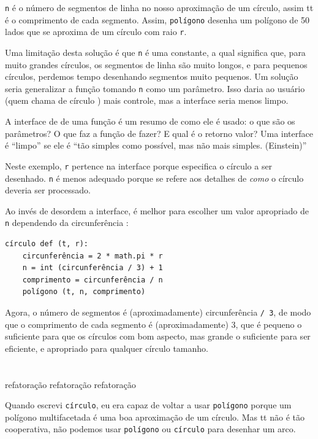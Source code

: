 \documentclass[10pt]{book}
\begin{document}
\begin{exercise}
{\tt n} é o número de segmentos de linha no nosso aproximação de um círculo,
assim {\comprimento tt} é o comprimento de cada segmento. Assim, {\tt polígono}
desenha um polígono de 50 lados que se aproxima de um círculo com raio {\tt r}.

Uma limitação desta solução é que {\tt n} é uma constante, a qual
significa que, para muito grandes círculos, os segmentos de linha são muito longos, e
para pequenos círculos, perdemos tempo desenhando segmentos muito pequenos. Um
solução seria generalizar a função tomando {\tt n} como
um parâmetro. Isso daria ao usuário (quem chama de círculo {\tt})
mais controle, mas a interface seria menos limpo.

A interface de {\bf} de uma função é um resumo de como ele é usado: o que
são os parâmetros? O que faz a função de fazer? E qual é o retorno
valor? Uma interface é ``limpo'' se ele é ``tão simples como
possível, mas não mais simples. (Einstein)''

Neste exemplo, {\tt r} pertence na interface porque
especifica o círculo a ser desenhado. {\tt n} é menos adequado
porque se refere aos detalhes de {\em como} o círculo deveria
ser processado.

Ao invés de desordem a interface, é melhor
para escolher um valor apropriado de {\tt n}
dependendo da circunferência {\tt}:

\begin{verbatim}
círculo def (t, r):
    circunferência = 2 * math.pi * r
    n = int (circunferência / 3) + 1
    comprimento = circunferência / n
    polígono (t, n, comprimento)
\end{verbatim}
%
Agora, o número de segmentos é (aproximadamente) {circunferência \tt / 3},
de modo que o comprimento de cada segmento é (aproximadamente) 3, que é pequeno
o suficiente para que os círculos com bom aspecto, mas grande o suficiente para ser eficiente,
e apropriado para qualquer círculo tamanho.


\section{} refatoração
\label{} refatoração
\index{} refatoração

Quando escrevi {\tt círculo}, eu era capaz de voltar a usar {\tt polígono}
porque um polígono multifacetada é uma boa aproximação de um círculo.
Mas {\arc tt} não é tão cooperativa, não podemos usar {\tt polígono}
ou {\tt círculo} para desenhar um arco.


\end{exercise}
\end{document}
